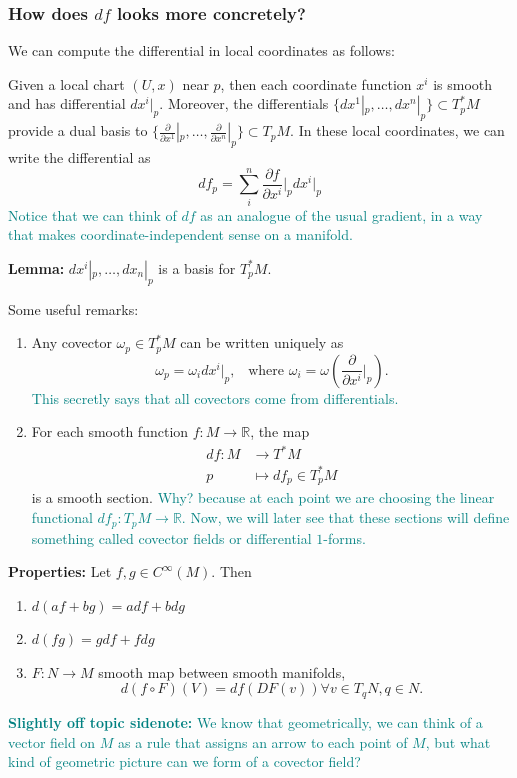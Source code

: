 \documentclass[10.5pt]{article}
\newcommand\R{\ensuremath{\mathbb{R}}}
\begin{document}
\subsubsection{How does $df$ looks more concretely?}
We can compute the differential in local coordinates as follows:

Given a local chart $(U, x)$ near $p$, then each coordinate function $x^i$ is smooth and has differential $ dx^i|_p$. Moreover, the differentials $\{dx^1|_p, \dots, dx^n|_p\}\subset T^*_pM$ provide a dual basis to $\{\frac{\partial }{\partial x^1}|_p, \dots,\frac{\partial }{\partial x^n}|_p\}\subset T_pM$. In these local coordinates, we can write the differential as
\[df_p=\sum_i^n\frac{\partial f}{\partial x^i}\Big|_p dx^i\Big|_p\]
\textcolor{teal}{ Notice that we can think of $df$ as an analogue of the usual gradient, in a way that makes coordinate-independent sense on a manifold.}

\textbf{Lemma:} $ dx^i|_p, \dots, dx_n|_p$ is a basis for $T^*_pM$.


Some useful remarks:
\begin{enumerate}
    \item Any covector $\omega_p\in T^*_pM$ can be written uniquely as 
    \[\omega_p=\omega_i dx^i\Big|_p, \,\,\,\text{ where }\omega_i=\omega\left(\frac{\partial}{\partial x^i}\Big|_p\right).\]
    \textcolor{teal}{This secretly says that all covectors come from differentials.}
    \item For each smooth function $f:M\to \R$, the map 
    \begin{align*}
        df:M&\to T^*M\\
    p&\mapsto df_p\in T^*_pM
    \end{align*}
    is a smooth section. \textcolor{teal}{Why? because at each point we are choosing the linear functional $df_p:T_pM\to \R$.}
    \textcolor{teal}{Now, we will later see that these sections will define something called covector fields or differential $1$-forms.}
\end{enumerate}
\textbf{Properties:} Let $f,g\in C^\infty(M)$. Then
\begin{enumerate}
    \item $d(af+bg)=adf+bdg$
    \item $d(fg)=gdf+fdg$
    \item $F:N\to M$ smooth map between smooth manifolds, 
    \[d(f\circ F)(V)=df(DF(v))\forall v\in T_qN, q\in N.\]
\end{enumerate}

\textcolor{teal}{\textbf{Slightly off topic sidenote:} We know that geometrically, we can think of a vector field on $M$ as a rule that assigns an arrow to each point of $M$, but what kind of geometric picture can we form of a covector field?}
\end{document}
